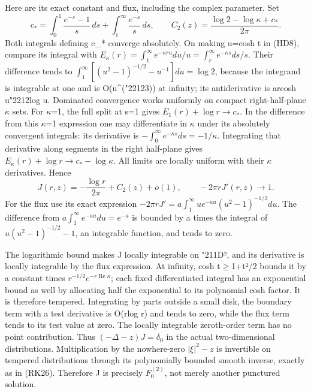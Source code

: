 \documentclass[
  11pt,
]{article}
\begin{document}
Here are its exact constant and flux, including the complex parameter.
Set \[
c_*=\int_0^1\frac{e^{-s}-1}{s}\,ds+
                       \int_1^\infty\frac{e^{-s}}s\,ds,
\qquad
C_2(z)=\frac{\log2-\log\kappa+c_*}{2\pi}.
\tag{HD9}
\] Both integrals defining c\_* converge absolutely. On making u=cosh t
in (HD8), compare its integral with
\(E_\kappa(r)=\int_1^\infty e^{-\kappa r u}du/u=\int_r^\infty e^{-\kappa s}ds/s\).
Their difference tends to
\(\int_1^\infty[(u^2-1)^{-1/2}-u^{-1}]du=\log2\), because the integrand
is integrable at one and is O(u\^{}({\ReaderSymbols\char"2212}3)) at infinity; its antiderivative
is arcosh u{\ReaderSymbols\char"2212}log u. Dominated convergence works uniformly on compact
right-half-plane \ensuremath{\kappa} sets. For \ensuremath{\kappa}=1, the full split at s=1 gives
\(E_1(r)+\log r\to c_*\). In the difference from this \ensuremath{\kappa}=1 expression one
may differentiate in \ensuremath{\kappa} under its absolutely convergent integrals: its
derivative is \(-\int_0^\infty e^{-\kappa s}ds=-1/\kappa\). Integrating
that derivative along segments in the right half-plane gives
\(E_\kappa(r)+\log r\to c_*-\log\kappa\). All limits are locally uniform
with their \ensuremath{\kappa} derivatives. Hence \[
J(r,z)=-\frac{\log r}{2\pi}+C_2(z)+o(1),
\qquad -2\pi rJ'(r,z)\longrightarrow1.
\tag{HD10}
\] For the flux use its exact expression
\(-2\pi rJ'=a\int_1^\infty u e^{-au}(u^2-1)^{-1/2}du\). The difference
from \(a\int_1^\infty e^{-au}du=e^{-a}\) is bounded by
\textbar a\textbar{} times the integral of \(u(u^2-1)^{-1/2}-1\), an
integrable function, and tends to zero.

The logarithmic bound makes J locally integrable on {\ReaderSymbols\char"211D}², and its
derivative is locally integrable by the flux expression. At infinity,
cosh t\ensuremath{\geq}1+t²/2 bounds it by a constant times
\(r^{-1/2}e^{-r\operatorname{Re}\kappa}\); each fixed differentiated
integral has an exponential bound as well by allocating half the
exponential to its polynomial cosh factor. It is therefore tempered.
Integrating by parts outside a small disk, the boundary term with a test
derivative is O(r\textbar log r\textbar) and tends to zero, while the
flux term tends to its test value at zero. The locally integrable
zeroth-order term has no point contribution. Thus
\((-\Delta-z)J=\delta_0\) in the actual two-dimensional distributions.
Multiplication by the nowhere-zero \(|\xi|^2-z\) is invertible on
tempered distributions through its polynomially bounded smooth inverse,
exactly as in (RK26). Therefore J is precisely \(F_0^{(2)}\), not merely
another punctured solution.
\end{document}
